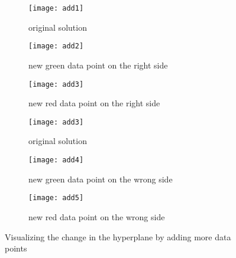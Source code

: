 \documentclass[conference,compsoc]{IEEEtran}
\begin{document}
   \begin{figure*}[]
        \begin{subfigure}{0.33\linewidth}
            \texttt{[image: add1]}
            \caption{original solution}
        \end{subfigure}
        \begin{subfigure}{0.33\linewidth}
            \texttt{[image: add2]}
            \caption{new green data point on the right side}
        \end{subfigure}
        \begin{subfigure}{0.33\linewidth}
            \texttt{[image: add3]}
            \caption{new red data point on the right side}
        \end{subfigure}


		\begin{subfigure}{0.33\linewidth}
            \texttt{[image: add3]}
            \caption{original solution}
        \end{subfigure}
        \begin{subfigure}{0.33\linewidth}
            \texttt{[image: add4]}
            \caption{new green data point on the wrong side}
        \end{subfigure}
        \begin{subfigure}{0.33\linewidth}
            \texttt{[image: add5]}
            \caption{new red data point on the wrong side}
        \end{subfigure}
   
 	
        \caption{Visualizing the change in the hyperplane by adding more data points}
        
        
       
    
        
        \label{fig:adding}
    \end{figure*}
\end{document}
